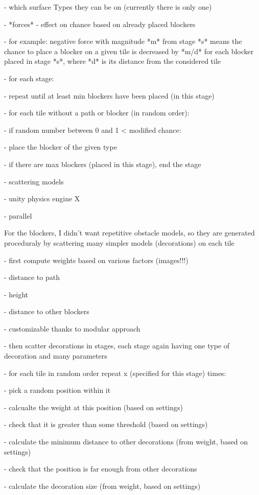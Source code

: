 - which surface Types they can be on (currently there is only one)

- *forces* - effect on chance based on already placed blockers

- for example: negative force with magnitude *m* from stage *s* means the chance to place a blocker on a given tile is decreased by *m/d*  for each blocker placed in stage *s*, where *d* is its distance from the considered tile

- for each stage:

- repeat until at least min blockers have been placed (in this stage)

- for each tile without a path or blocker (in random order):

- if random number between 0 and 1 < modified chance:

- place the blocker of the given type

- if there are max blockers (placed in this stage), end the stage

- scattering models

- unity physics engine X

- parallel

For the blockers, I didn't want repetitive obstacle models, so they are generated proceduraly by scattering many simpler models (decorations) on each tile

- first compute weights based on various factors (images!!!)

- distance to path

- height

- distance to other blockers

- customizable thanks to modular approach

- then scatter decorations in stages, each stage again having one type of decoration and many parameters

- for each tile in random order repeat x (specified for this stage) times:

- pick a random position within it

- calcualte the weight at this position (based on settings)

- check that it is greater than some threshold (based on settings)

- calculate the minimum distance to other decorations (from weight, based on settings)

- check that the position is far enough from other decorations

- calculate the decoration size (from weight, based on settings)

